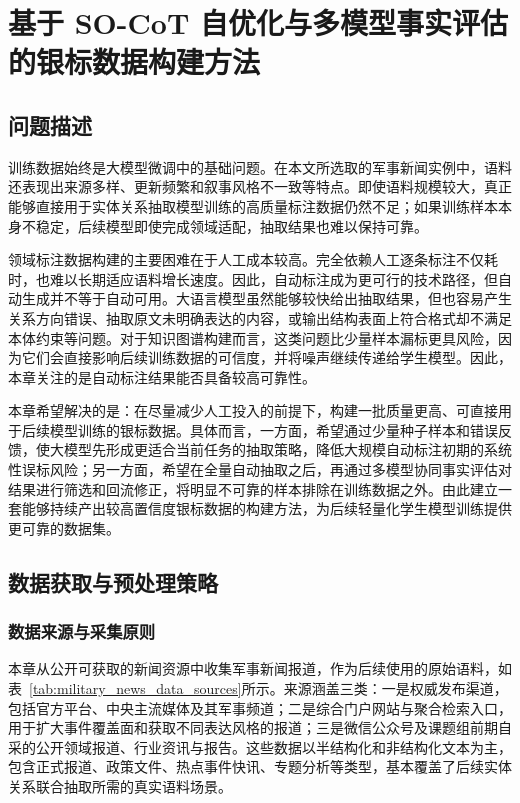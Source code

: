 
\chapter{基于 SO-CoT 自优化与多模型事实评估的银标数据构建方法}
\label{chap:silver-data}

\section{问题描述}

训练数据始终是大模型微调中的基础问题。在本文所选取的军事新闻实例中，语料还表现出来源多样、更新频繁和叙事风格不一致等特点。即使语料规模较大，真正能够直接用于实体关系抽取模型训练的高质量标注数据仍然不足；如果训练样本本身不稳定，后续模型即使完成领域适配，抽取结果也难以保持可靠。

领域标注数据构建的主要困难在于人工成本较高。完全依赖人工逐条标注不仅耗时，也难以长期适应语料增长速度。因此，自动标注成为更可行的技术路径，但自动生成并不等于自动可用。大语言模型虽然能够较快给出抽取结果，但也容易产生关系方向错误、抽取原文未明确表达的内容，或输出结构表面上符合格式却不满足本体约束等问题。对于知识图谱构建而言，这类问题比少量样本漏标更具风险，因为它们会直接影响后续训练数据的可信度，并将噪声继续传递给学生模型。因此，本章关注的是自动标注结果能否具备较高可靠性。

本章希望解决的是：在尽量减少人工投入的前提下，构建一批质量更高、可直接用于后续模型训练的银标数据。具体而言，一方面，希望通过少量种子样本和错误反馈，使大模型先形成更适合当前任务的抽取策略，降低大规模自动标注初期的系统性误标风险；另一方面，希望在全量自动抽取之后，再通过多模型协同事实评估对结果进行筛选和回流修正，将明显不可靠的样本排除在训练数据之外。由此建立一套能够持续产出较高置信度银标数据的构建方法，为后续轻量化学生模型训练提供更可靠的数据集。

\section{数据获取与预处理策略}

\subsection{数据来源与采集原则}

本章从公开可获取的新闻资源中收集军事新闻报道，作为后续使用的原始语料，如表~\ref{tab:military_news_data_sources}所示。来源涵盖三类：一是权威发布渠道，包括官方平台、中央主流媒体及其军事频道；二是综合门户网站与聚合检索入口，用于扩大事件覆盖面和获取不同表达风格的报道；三是微信公众号及课题组前期自采的公开领域报道、行业资讯与报告。这些数据以半结构化和非结构化文本为主，包含正式报道、政策文件、热点事件快讯、专题分析等类型，基本覆盖了后续实体关系联合抽取所需的真实语料场景。

